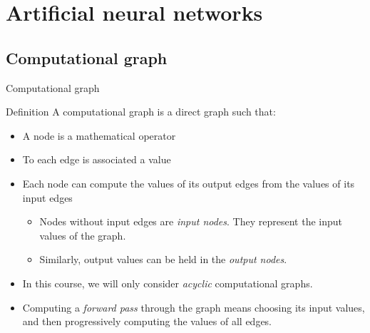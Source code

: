 \documentclass[xcolor=pdftex,dvipsnames,table,mathserif]{beamer}
\begin{document}
\section{Artificial neural networks}

\subsection{Computational graph}

\begin{frame}{Computational graph}

  \begin{block}{Definition}
    A computational graph is a direct graph such that:
    \begin{itemize}
    \item A node is a mathematical operator
    \item To each edge is associated a value
    \item Each node can compute the values of its output edges from the values of its input edges
      \begin{itemize}
      \item Nodes without input edges are \emph{input nodes}. They represent the input values of the graph.
      \item Similarly, output values can be held in the \emph{output nodes}.
      \end{itemize}
    \end{itemize}
  \end{block}

  \begin{itemize}
  \item   In this course, we will only consider \emph{acyclic} computational graphs.
  \item   Computing a \emph{forward pass} through the graph means choosing its input values, and then progressively computing the values of all edges.
  \end{itemize}

\end{frame}
\end{document}
